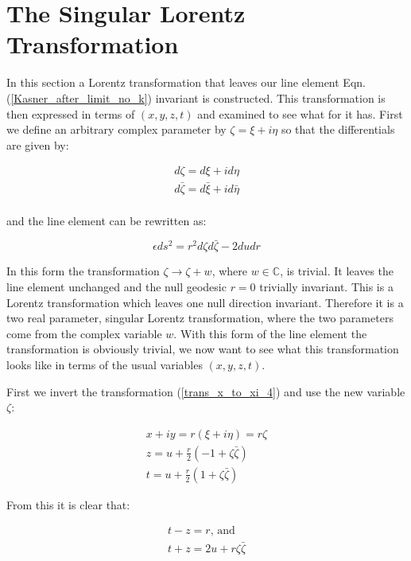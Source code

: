 \section{The Singular Lorentz Transformation}

In this section a Lorentz transformation that leaves our line element Eqn.(\ref{Kasner_after_limit_no_k}) invariant is constructed. This transformation is then expressed in terms of $(x,y,z,t)$ and examined to see what for it has. First we define an arbitrary complex parameter by $\zeta = \xi + i \eta$ so that the differentials are given by:

\begin{eqnarray*}
d\zeta = {d\xi} + i {d\eta} \\
d\bar{\zeta} = {d\bar{\xi}} + i {d\bar{\eta}} \\
\end{eqnarray*}

\noindent and the line element can be rewritten as:

\begin{equation*}
\epsilon {ds^2} = r^2 {d\zeta}{d\bar{\zeta}} - 2 {du}{dr}
\end{equation*}

\noindent In this form the transformation $\zeta \rightarrow \zeta + w$, where $w \in \mathbb{C}$, is trivial. It leaves the line element unchanged and the null geodesic $r = 0$ trivially invariant. This is a Lorentz transformation which leaves one null direction invariant. Therefore it is a two real parameter, singular Lorentz transformation, where the two parameters come from the complex variable $w$. With this form of the line element the transformation is obviously trivial, we now want to see what this transformation looks like in terms of the usual variables $(x,y,z,t)$.

First we invert the transformation (\ref{trans_x_to_xi_4}) and use the new variable $\zeta$:

\begin{eqnarray*} 
x + iy = r (\xi + i \eta) = r \zeta \\
z = u + \frac{r}{2}(-1 + \zeta \bar{\zeta}) \\
t = u + \frac{r}{2}(1 + \zeta \bar{\zeta})
\end{eqnarray*}

\noindent From this it is clear that:

\begin{eqnarray*}
t - z = r \text{, and } \\
t + z = 2 u + r \zeta \bar{\zeta} 
\end{eqnarray*}

